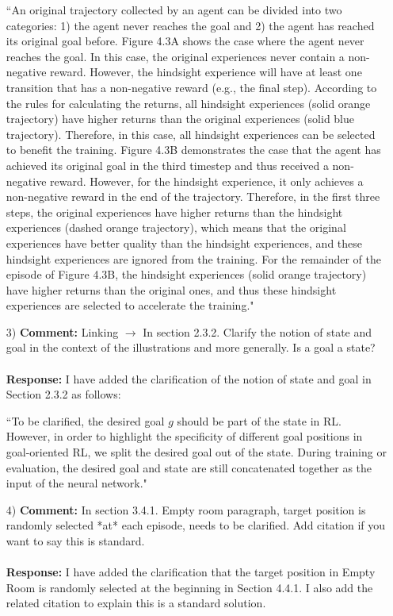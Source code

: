 \documentclass[11pt]{article}
\begin{document}
\begin{enumerate}
``An original trajectory collected by an agent can be divided into two categories: 1) the agent never reaches the goal and 2) the agent has reached its original goal before. Figure 4.3A shows the case where the agent never reaches the goal. In this case, the original experiences never contain a non-negative reward. However, the hindsight experience will have at least one transition that has a non-negative reward (e.g., the final step). According to the rules for calculating the returns, all hindsight experiences (solid orange trajectory) have higher returns than the original experiences (solid blue trajectory). Therefore, in this case, all hindsight experiences can be selected to benefit the training. Figure 4.3B demonstrates the case that the agent has achieved its original goal in the third timestep and thus received a non-negative reward. However, for the hindsight experience, it only achieves a non-negative reward in the end of the trajectory. Therefore, in the first three steps, the original experiences have higher returns than the hindsight experiences (dashed orange trajectory), which means that the original experiences have better quality than the hindsight experiences, and these hindsight experiences are ignored from the training. For the remainder of the episode of Figure 4.3B, the hindsight experiences (solid orange trajectory) have higher returns than the original ones, and thus these hindsight experiences are selected to accelerate the training."

\item[3)] \textbf{Comment:} Linking $\rightarrow$ In section 2.3.2. Clarify the notion of state and goal in the context of the illustrations and more generally. Is a goal a state?
\\ \\
\textbf{Response:} I have added the clarification of the notion of state and goal in Section 2.3.2 as follows:

``To be clarified, the desired goal $g$ should be part of the state in RL. However, in order to highlight the specificity of different goal positions in goal-oriented RL, we split the desired goal out of the state. During training or evaluation, the desired goal and state are still concatenated together as the input of the neural network."

\item[4)] \textbf{Comment:} In section 3.4.1. Empty room paragraph, target position is randomly selected *at* each episode, needs to be clarified. Add citation if you want to say this is standard.
\\ \\
\textbf{Response:} I have added the clarification that the target position in Empty Room is randomly selected at the beginning in Section 4.4.1. I also add the related citation to explain this is a standard solution.
\end{enumerate}
\end{document}
